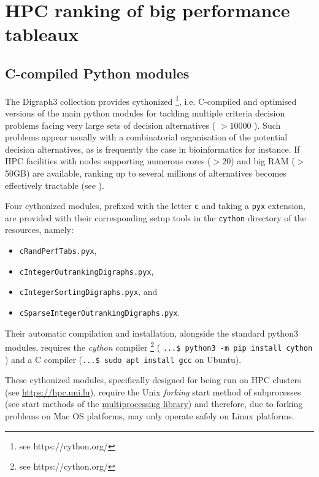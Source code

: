 \chapter{HPC ranking of big performance tableaux}
\label{sec:11}



\section{C-compiled Python modules}
\label{sec:11.1}

The Digraph3 collection provides cythonized \footnote{see https://cython.org/}, i.e. C-compiled and optimised versions of the main python modules for tackling multiple criteria decision problems facing very large sets of decision alternatives ( $> 10000$ ). Such problems appear usually with a combinatorial organisation of the potential decision alternatives, as is frequently the case in bioinformatics for instance. If HPC facilities with nodes supporting numerous cores ($> 20$) and big RAM ($>$ 50GB) are available, ranking up to several millions of alternatives becomes effectively tractable (see \citep{BIS-2016}).

Four cythonized \Digraph modules, prefixed with the letter \texttt{c} and taking a \texttt{pyx} extension, are provided with their corresponding setup tools in the \texttt{cython} directory of the \Digraph resources, namely:
\begin{itemize}
\item[] \texttt{cRandPerfTabs.pyx},
\item[] \texttt{cIntegerOutrankingDigraphs.pyx},
\item[] \texttt{cIntegerSortingDigraphs.pyx}, and
\item[] \texttt{cSparseIntegerOutrankingDigraphs.pyx}.
\end{itemize}

Their automatic compilation and installation, alongside the standard \Digraph python3 modules, requires the \emph{cython} compiler \footnote{see https://cython.org/} ( \texttt{...\$ python3 -m pip install cython} ) and a C compiler (\texttt{...\$ sudo apt install gcc} on Ubuntu).

These cythonized modules, specifically designed for being run on HPC clusters (see \href{https://hpc.uni.lu}{https://hpc.uni.lu}), require the Unix \emph{forking} start method of subprocesses (see start methods of the \href{https://docs.python.org/3/library/multiprocessing.html#contexts-and-start-methods}{multiprocessing library})  and therefore, due to forking problems on Mac OS platforms, may only operate safely on Linux platforms.

